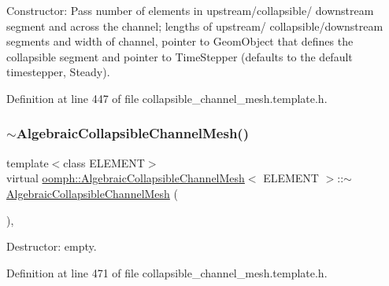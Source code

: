 Constructor\+: Pass number of elements in upstream/collapsible/ downstream segment and across the channel; lengths of upstream/ collapsible/downstream segments and width of channel, pointer to Geom\+Object that defines the collapsible segment and pointer to Time\+Stepper (defaults to the default timestepper, Steady). 



Definition at line 447 of file collapsible\+\_\+channel\+\_\+mesh.\+template.\+h.

\mbox{\label{classoomph_1_1AlgebraicCollapsibleChannelMesh_ab921ed3dbc5678fc5d39626fdf32c4ed}} 
\subsubsection{\texorpdfstring{$\sim$\+Algebraic\+Collapsible\+Channel\+Mesh()}{~AlgebraicCollapsibleChannelMesh()}}
{\footnotesize\ttfamily template$<$class E\+L\+E\+M\+E\+NT$>$ \\
virtual \hyperlink{classoomph_1_1AlgebraicCollapsibleChannelMesh}{oomph\+::\+Algebraic\+Collapsible\+Channel\+Mesh}$<$ E\+L\+E\+M\+E\+NT $>$\+::$\sim$\hyperlink{classoomph_1_1AlgebraicCollapsibleChannelMesh}{Algebraic\+Collapsible\+Channel\+Mesh} (\begin{DoxyParamCaption}{ }\end{DoxyParamCaption})\hspace{0.3cm}{\ttfamily [inline]}, {\ttfamily [virtual]}}



Destructor\+: empty. 



Definition at line 471 of file collapsible\+\_\+channel\+\_\+mesh.\+template.\+h.

\mbox{\label{classoomph_1_1AlgebraicCollapsibleChannelMesh_a3c19524e69a9408c79047d130b79d6b3}} 
